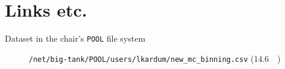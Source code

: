 \clearpage
\section{Links etc.}
\begin{description}
  \item[Dataset in the chair's \texttt{POOL} file system] \texttt{/net/big-tank/POOL/users/lkardum/new\_mc\_binning.csv} (\SI{14.6}{\giga\byte})
\end{description}
